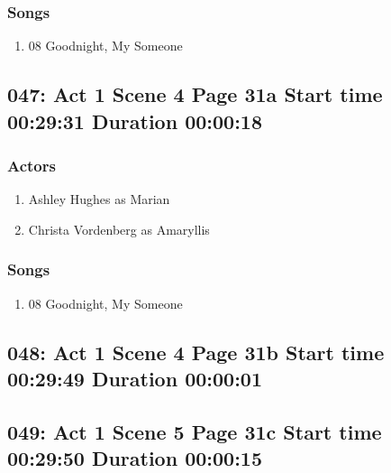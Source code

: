 \subsubsection{Songs}
\begin{enumerate}
\item 08 Goodnight, My Someone
\end{enumerate}
\subsection{047: Act 1 Scene 4 Page 31a Start time 00:29:31 Duration 00:00:18}

\subsubsection{Actors}
\begin{enumerate}
\item Ashley Hughes as Marian
\item Christa Vordenberg as Amaryllis
\end{enumerate}

\subsubsection{Songs}
\begin{enumerate}
\item 08 Goodnight, My Someone
\end{enumerate}
\subsection{048: Act 1 Scene 4 Page 31b Start time 00:29:49 Duration 00:00:01}

\subsection{049: Act 1 Scene 5 Page 31c Start time 00:29:50 Duration 00:00:15}

